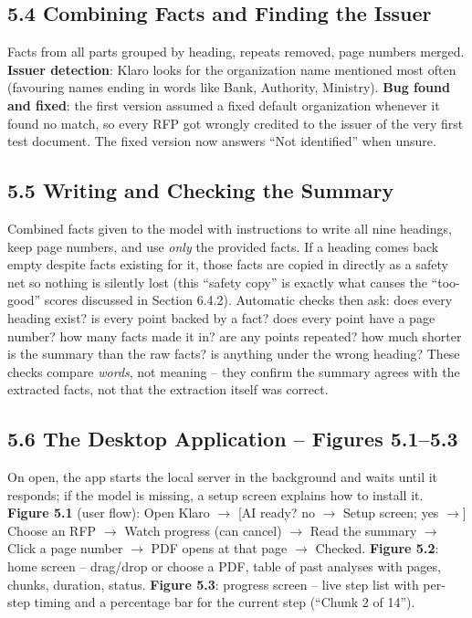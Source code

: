 \documentclass[11pt,a4paper]{article}
\begin{document}
\subsection*{5.4 Combining Facts and Finding the Issuer}
Facts from all parts grouped by heading, repeats removed, page numbers merged. \textbf{Issuer
detection}: Klaro looks for the organization name mentioned most often (favouring names ending in
words like Bank, Authority, Ministry). \textbf{Bug found and fixed}: the first version assumed a
fixed default organization whenever it found no match, so every RFP got wrongly credited to the
issuer of the very first test document. The fixed version now answers ``Not identified'' when unsure.

\subsection*{5.5 Writing and Checking the Summary}
Combined facts given to the model with instructions to write all nine headings, keep page numbers,
and use \emph{only} the provided facts. If a heading comes back empty despite facts existing for it,
those facts are copied in directly as a safety net so nothing is silently lost (this ``safety copy''
is exactly what causes the ``too-good'' scores discussed in Section 6.4.2). Automatic checks then ask:
does every heading exist? is every point backed by a fact? does every point have a page number? how
many facts made it in? are any points repeated? how much shorter is the summary than the raw facts?
is anything under the wrong heading? These checks compare \emph{words}, not meaning -- they confirm
the summary agrees with the extracted facts, not that the extraction itself was correct.

\subsection*{5.6 The Desktop Application -- Figures 5.1--5.3}
On open, the app starts the local server in the background and waits until it responds; if the model
is missing, a setup screen explains how to install it. \textbf{Figure 5.1} (user flow): Open Klaro
$\to$ [AI ready? no $\to$ Setup screen; yes $\to$] Choose an RFP $\to$ Watch progress (can cancel)
$\to$ Read the summary $\to$ Click a page number $\to$ PDF opens at that page $\to$ Checked.
\textbf{Figure 5.2}: home screen -- drag/drop or choose a PDF, table of past analyses with pages,
chunks, duration, status. \textbf{Figure 5.3}: progress screen -- live step list with per-step timing
and a percentage bar for the current step (``Chunk 2 of 14'').
\end{document}
